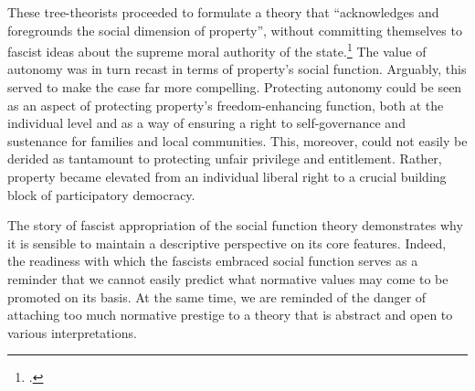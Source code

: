 {%

These tree-theorists proceeded to formulate a theory that ``acknowledges and foregrounds the social dimension of property'', without committing themselves to fascist ideas about the supreme moral authority of the state.\footcite[907]{robilant13} The value of autonomy was in turn recast in terms of property's social function. Arguably, this served to make the case far more compelling. Protecting autonomy could be seen as an aspect of protecting property's freedom-enhancing function, both at the individual level and as a way of ensuring a right to self-governance and sustenance for families and local communities. This, moreover, could not easily be derided as tantamount to protecting unfair privilege and entitlement. Rather, property became elevated from an individual liberal right to a crucial building block of participatory democracy.

The story of fascist appropriation of the social function theory demonstrates why it is sensible to maintain a descriptive perspective on its core features. Indeed, the readiness with which the fascists embraced social function  serves as a reminder that we cannot easily predict what normative values may come to be promoted on its basis. At the same time, we are reminded of the danger of attaching too much normative prestige to a theory that is abstract and open to various interpretations.

}
